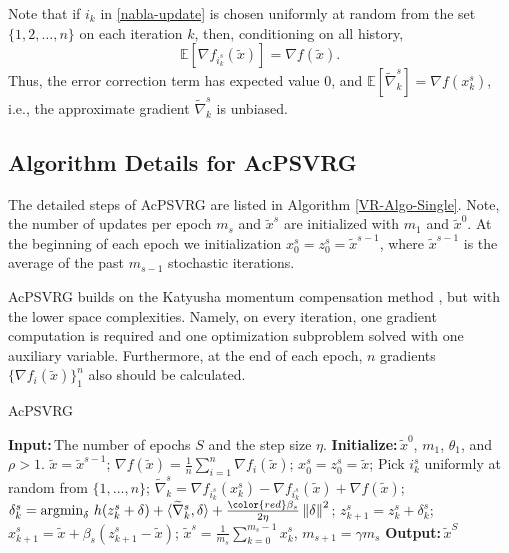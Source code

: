 \documentclass[10pt, conference, compsocconf]{IEEEtran}
\newcommand*{\E}{\mathbb{E}}
\newcommand{\norm}[1]{\left\lVert#1\right\rVert}
\newcommand{\Initialize}{\textbf{Initialize:}{\,}}
\newcommand{\Input}{\textbf{Input:}{\,}}
\newcommand{\Output}{\textbf{Output:}{\,}}
\theoremstyle{definition}
\theoremstyle{remark}
\begin{document}
Note that if $i_k$ in \eqref{nabla-update} is chosen uniformly at random from the set $\{1,2,\ldots,n\}$ on each iteration $k$, then, conditioning on all history,
\[
\E[\nabla f_{i_k^s}(\widetilde{x})] = \nabla f(\widetilde{x}).
\] 
Thus, the error correction term has expected value 0, and $\E[\widetilde{\nabla}_k^s] = \nabla f(x_{k}^s)$, i.e., the approximate gradient $\widetilde{\nabla}_k^s$ is unbiased.

\subsection{Algorithm Details for AcPSVRG}
The detailed steps of AcPSVRG are listed in Algorithm \ref{VR-Algo-Single}. Note, the number of updates per epoch $m_s$ and $\widetilde{x}^s$ are initialized with $m_1$ and $\widetilde{x}^0$. At the beginning of each epoch we initialization $x_0^s=z_0^s=\widetilde{x}^{s-1}$, where $\widetilde{x}^{s-1}$ is the average of the past $m_{s-1}$ stochastic iterations.

AcPSVRG builds on the Katyusha momentum compensation method \cite{Allen-Zhu17}, but with the lower space complexities. Namely, on every iteration, one gradient computation is required and one optimization subproblem solved with one auxiliary variable. Furthermore, at the end of each epoch, $n$ gradients $\{\nabla f_i (\widetilde{x})\}_{1}^{n}$ also should be calculated.

\begin{algorithm}[H]
\caption{AcPSVRG}\label{VR-Algo-Single}
\begin{algorithmic}
\State\Input The number of epochs $S$ and the step size $\eta$.
\State\Initialize $\widetilde{x}^0$, $m_1$, $\theta_1$, and $\rho > 1$.
\State $\widetilde{x} = \widetilde{x}^{s-1}$;
\State  $\nabla f(\widetilde{x}) = \frac{1}{n}\sum_{i=1}^n\nabla f_i(\widetilde{x})$;
 \State $x_0^s = z_0^s = \widetilde{x}$;
 \State Pick $i_k^s$ uniformly at random from $\{1,\ldots,n\}$;
 \State $\widetilde{\nabla}_k^s = \nabla f_{i_k^s}(x_{k}^s) - \nabla f_{i_k^s}(\widetilde{x}) + \nabla f(\widetilde{x})$;
 \State $\delta_k^s = \text{argmin}_{\delta}\,\,h(z_k^s+\delta)+\langle\widetilde{\nabla}_k^s,\delta\rangle + \frac{{\color{red}\beta_s}}{2\eta}\norm{\delta}^2$;
 \State $z_{k+1}^s = z_{k}^s + \delta_k^s$;
 \State $x_{k+1}^s = \widetilde{x}+\beta_s(z_{k+1}^s-\widetilde{x})$;
 \EndFor
$\widetilde{x}^s = \frac{1}{m_s}\sum_{k=0}^{m_s-1} x_{k}^s$, $m_{s+1} = \gamma m_s$
 \EndFor
 \State\Output $\widetilde{x}^S$
\end{algorithmic}
\end{algorithm}
\end{document}
